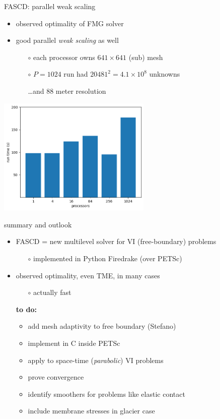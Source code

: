 \documentclass[svgnames,
               hyperref={colorlinks,citecolor=DeepPink4,linkcolor=FireBrick,urlcolor=Maroon},
               usepdftitle=false]  %
               {beamer}
\begin{document}
\begin{frame}{FASCD: parallel weak scaling}

\begin{itemize}
\item observed optimality of FMG solver
\item good parallel \emph{weak scaling} as well
    \begin{itemize}
    \item[$\circ$] each processor owns $641\times 641$ (sub) mesh
    \item[$\circ$] $P=1024$ run had $20481^2=4.1\times 10^8$ unknowns
    \item[] \dots and 88 meter resolution
    \end{itemize}
\end{itemize}

\bigskip
\centering
\includegraphics[width=0.55\textwidth]{figs/siaweaktime.png}
\end{frame}


\begin{frame}{summary and outlook}

\begin{itemize}
\item FASCD = new multilevel solver for VI (free-boundary) problems
    \begin{itemize}
    \item[$\circ$] implemented in Python Firedrake (over PETSc)
    \end{itemize}
\item observed optimality, even TME, in many cases
    \begin{itemize}
    \item[$\circ$] actually fast
    \end{itemize}

\bigskip\bigskip
\item[] \textbf{{\color{FireBrick} to do:}}
    \begin{itemize}
    \item add mesh adaptivity to free boundary (Stefano)
    \item implement in C inside PETSc
    \item apply to space-time (\emph{parabolic}) VI problems
    \item prove convergence
    \item identify smoothers for problems like elastic contact
    \item include membrane stresses in glacier case
    \end{itemize}
\end{itemize}
\end{frame}
\end{document}
